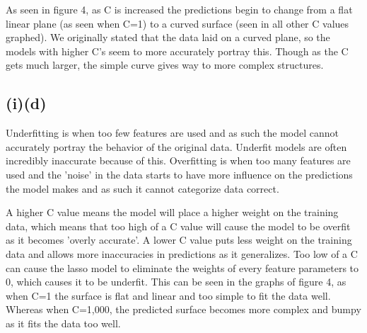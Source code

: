\documentclass{article}
\begin{document}
As seen in figure 4, as C is increased the predictions begin to change from a flat linear plane (as seen when C=1) to a curved surface (seen in all other C values graphed). We originally stated that the data laid on a curved plane, so the models with higher C's seem to more accurately portray this. Though as the C gets much larger, the simple curve gives way to more complex structures.

\subsection{(i)(d)}
Underfitting is when too few features are used and as such the model cannot accurately portray the behavior of the original data. Underfit models are often incredibly inaccurate because of this. Overfitting is when too many features are used and the 'noise' in the data starts to have more influence on the predictions the model makes and as such it cannot categorize data correct.

A higher C value means the model will place a higher weight on the training data, which means that too high of a C value will cause the model to be overfit as it becomes 'overly accurate'. A lower C value puts less weight on the training data and allows more inaccuracies in predictions as it generalizes. Too low of a C can cause the lasso model to eliminate the weights of every feature parameters to 0, which causes it to be underfit. This can be seen in the graphs of figure 4, as when C=1 the surface is flat and linear and too simple to fit the data well. Whereas when C=1,000, the predicted surface becomes more complex and bumpy as it fits the data too well. 
\end{document}
